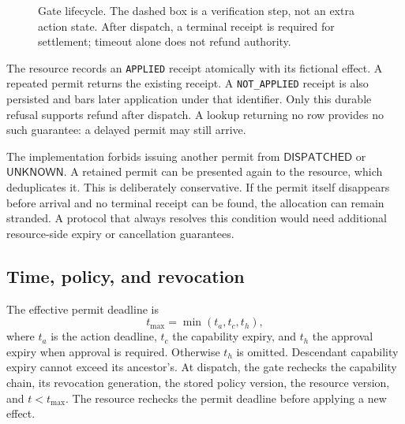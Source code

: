 \documentclass[10pt,journal,a4paper]{IEEEtran}
\newcommand{\code}[1]{\texttt{#1}}
\newcommand{\state}[1]{\ensuremath{\mathsf{#1}}}
\begin{document}
\begin{figure}[t]
\centering
{}
\caption{Gate lifecycle. The dashed box is a verification step, not an extra action state. After dispatch, a terminal receipt is required for settlement; timeout alone does not refund authority.}
\label{fig:states}
\end{figure}

The resource records an \code{APPLIED} receipt atomically with its fictional effect. A repeated permit returns the existing receipt. A \code{NOT\_APPLIED} receipt is also persisted and bars later application under that identifier. Only this durable refusal supports refund after dispatch. A lookup returning no row provides no such guarantee: a delayed permit may still arrive.

The implementation forbids issuing another permit from \state{DISPATCHED} or \state{UNKNOWN}. A retained permit can be presented again to the resource, which deduplicates it. This is deliberately conservative. If the permit itself disappears before arrival and no terminal receipt can be found, the allocation can remain stranded. A protocol that always resolves this condition would need additional resource-side expiry or cancellation guarantees.

\subsection{Time, policy, and revocation}
The effective permit deadline is
\begin{equation}
t_{\max}=\min(t_a,t_c,t_h),
\label{eq:expiry}
\end{equation}
where $t_a$ is the action deadline, $t_c$ the capability expiry, and $t_h$ the approval expiry when approval is required. Otherwise $t_h$ is omitted. Descendant capability expiry cannot exceed its ancestor's. At dispatch, the gate rechecks the capability chain, its revocation generation, the stored policy version, the resource version, and $t<t_{\max}$. The resource rechecks the permit deadline before applying a new effect.
\end{document}

